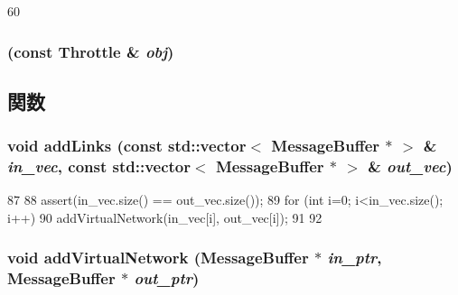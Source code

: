 \begin{DoxyCode}
60 {}
\end{DoxyCode}
\hypertarget{classThrottle_a834d68752709e4d48a36c4677edc7bc4}{
\subsubsection[{Throttle}]{ (const {\bf Throttle} \& {\em obj})}}
\label{classThrottle_a834d68752709e4d48a36c4677edc7bc4}


\subsection{関数}
\hypertarget{classThrottle_af6b7c214ef1a4bd74fc4282bd1526b0f}{
\subsubsection[{addLinks}]{\setlength{\rightskip}{0pt plus 5cm}void addLinks (const {\bf std::vector}$<$ {\bf MessageBuffer} $\ast$ $>$ \& {\em in\_\-vec}, \/  const {\bf std::vector}$<$ {\bf MessageBuffer} $\ast$ $>$ \& {\em out\_\-vec})}}
\label{classThrottle_af6b7c214ef1a4bd74fc4282bd1526b0f}



\begin{DoxyCode}
87 {
88     assert(in_vec.size() == out_vec.size());
89     for (int i=0; i<in_vec.size(); i++) {
90         addVirtualNetwork(in_vec[i], out_vec[i]);
91     }
92 }
\end{DoxyCode}
\hypertarget{classThrottle_a799e1642559b1e43258f49eca0a6653c}{
\subsubsection[{addVirtualNetwork}]{\setlength{\rightskip}{0pt plus 5cm}void addVirtualNetwork ({\bf MessageBuffer} $\ast$ {\em in\_\-ptr}, \/  {\bf MessageBuffer} $\ast$ {\em out\_\-ptr})}}
\label{classThrottle_a799e1642559b1e43258f49eca0a6653c}



